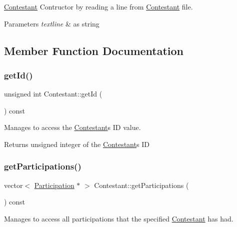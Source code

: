 \hyperlink{class_contestant}{Contestant} Contructor by reading a line from \hyperlink{class_contestant}{Contestant} file. 


\begin{DoxyParams}{Parameters}
{\em textline} & as string \\
\hline
\end{DoxyParams}


\subsection{Member Function Documentation}
\mbox{\label{class_contestant_af3b5ca4f5150092fac946d6aa7301cd3}} 
\subsubsection{\texorpdfstring{get\+Id()}{getId()}}
{\footnotesize\ttfamily unsigned int Contestant\+::get\+Id (\begin{DoxyParamCaption}{ }\end{DoxyParamCaption}) const}



Manages to access the \hyperlink{class_contestant}{Contestant}\textquotesingle{}s ID value. 

\begin{DoxyReturn}{Returns}
unsigned integer of the \hyperlink{class_contestant}{Contestant}\textquotesingle{}s ID 
\end{DoxyReturn}
\mbox{\label{class_contestant_abd0caa85a134d63212cf9e0f9ccc7a1d}} 
\subsubsection{\texorpdfstring{get\+Participations()}{getParticipations()}}
{\footnotesize\ttfamily vector$<$ \hyperlink{class_participation}{Participation} $\ast$ $>$ Contestant\+::get\+Participations (\begin{DoxyParamCaption}{ }\end{DoxyParamCaption}) const}



Manages to access all participations that the specified \hyperlink{class_contestant}{Contestant} has had. 

